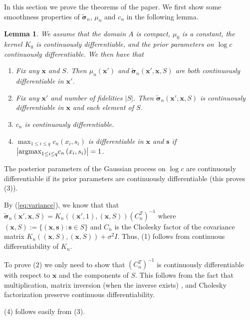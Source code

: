 \documentclass[letterpaper]{article}
\providecommand{\argmax}{{\rm argmax}}
\newcommand{\stcomment}[1]{{\color{red} PF: #1}}
\newcommand{\pfcomment}[1]{{\color{blue} PF: #1}}
\newcommand{\cost}{c}
\newcommand{\x}{\mathbf{x}}
\newcommand{\s}{\mathbf{s}}
\renewcommand{\S}{S}
\newcommand{\chol}{C}
\newcommand{\sigmatilde}{\tilde{\mathbf{\sigma}}}
\newcommand{\xS}{(\x,\S)} %
\newcommand{\A}{A}
\newtheorem{lemma}{Lemma}
\theoremstyle{definition}
\numberwithin{equation}{section}
\begin{document}
In this section we prove the theorems of the paper. We first show some smoothness properties of $\sigmatilde_{n}$, $\mu_{n}$ and  $\cost_{n}$ in the following lemma.
\begin{lemma}
\label{smooth_lemma}
We assume that the domain  $\A$ is compact, $\mu_0$ is a constant, the kernel $K_{0}$ is continuously differentiable, and the prior parameters on $\log \cost$ continuously differentiable.
We then have that
\begin{enumerate}
\item Fix any $\x$ and $\S$.  Then $\mu_{n}(\x')$ and $\sigmatilde_{n}\left(\x',\x,\S \right)$ are both continuously differentiable in $\x'$.
\item Fix any $\x'$ and number of fidelities $|\S|$. Then $\sigmatilde_{n}\left(\x',\x,\S \right)$ is continuously  differentiable in $\x$ and each element of $\S$.
\item $\cost_{n}$ is continuously differentiable.
\item $\max_{1 \le i \le q}\cost_{n}(x_i, s_i)$ is differentiable in $\x$ and $\s$ if $\left|\argmax_{1\leq i\leq q}\cost_{n}\left(x_{i},s_{i}\right)\right|=1$.
\end{enumerate}
\end{lemma}
\proof{}
The posterior parameters of the Gaussian process on $\log \cost$ are continuously differentiable if its prior parameters are  continuously differentiable (this proves (3)). 

By (\ref{eq:variance}), we know that that $\sigmatilde_n(\x',\x,\S)= K_n\left((\x', 1), \xS\right) (\chol_{n}^T)^{-1}$
where $\xS := \{(\x, \s): \s \in \S\}$ and $\chol_{n}$ is the Cholesky factor of the covariance matrix $K_n\left(\xS, \xS \right)+\sigma^2 I$.
Thus, (1) follows from continuous differentiability of $K_n$.

To prove (2) we only need to show that $(\chol_{n}^T)^{-1}$ is continuously differentiable with respect to $\x$ and the components of $\S$. This follows from the fact that multiplication, matrix inversion (when the inverse exists) ,
and Cholesky factorization \citep{smith1995differentiation} preserve continuous differentiability. 

(4) follows easily from (3).
\endproof
\end{document}
